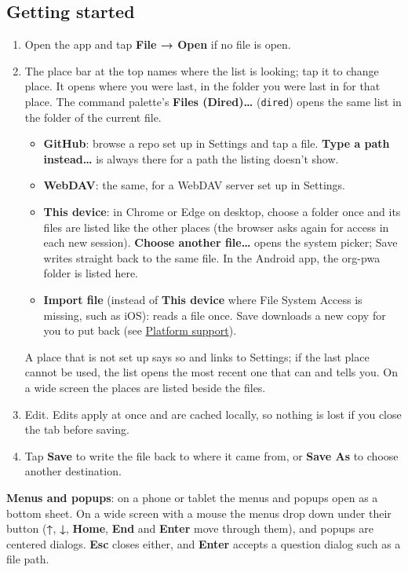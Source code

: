\documentclass[11pt]{article}
\begin{document}
\subsection{Getting started}
\label{sec:org1897c34}
\begin{enumerate}
\item Open the app and tap \textbf{File → Open} if no file is open.
\item The place bar at the top names where the list is looking; tap it to change place. It opens where you were last, in the folder you were last in for that place. The command palette's \textbf{Files (Dired)…} (\texttt{dired}) opens the same list in the folder of the current file.

\begin{itemize}
\item \textbf{GitHub}: browse a repo set up in Settings and tap a file. \textbf{Type a path instead…} is always there for a path the listing doesn't show.
\item \textbf{WebDAV}: the same, for a WebDAV server set up in Settings.
\item \textbf{This device}: in Chrome or Edge on desktop, choose a folder once and its files are listed like the other places (the browser asks again for access in each new session). \textbf{Choose another file…} opens the system picker; Save writes straight back to the same file. In the Android app, the org-pwa folder is listed here.
\item \textbf{Import file} (instead of \textbf{This device} where File System Access is missing, such as iOS): reads a file once. Save downloads a new copy for you to put back (see \hyperref[sec:orgc1b1d56]{Platform support}).
\end{itemize}

A place that is not set up says so and links to Settings; if the last place cannot be used, the list opens the most recent one that can and tells you. On a wide screen the places are listed beside the files.

\item Edit. Edits apply at once and are cached locally, so nothing is lost if you close the tab before saving.
\item Tap \textbf{Save} to write the file back to where it came from, or \textbf{Save As} to choose another destination.
\end{enumerate}

\textbf{Menus and popups}: on a phone or tablet the menus and popups open as a bottom sheet. On a wide screen with a mouse the menus drop down under their button (\textbf{↑}, \textbf{↓}, \textbf{Home}, \textbf{End} and \textbf{Enter} move through them), and popups are centered dialogs. \textbf{Esc} closes either, and \textbf{Enter} accepts a question dialog such as a file path.
\end{document}
